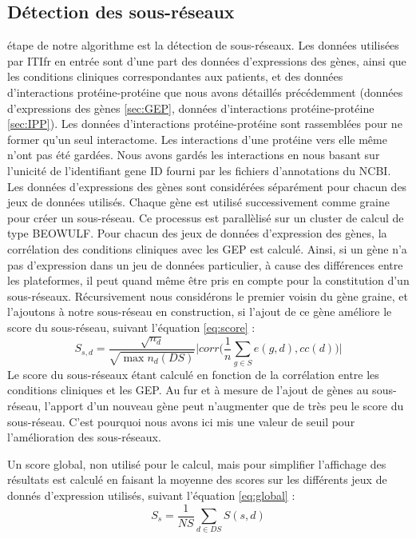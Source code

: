 		\subsection{\textcolor{green!60!black}{Détection des sous-réseaux}}
			 étape de notre algorithme est la détection de sous-réseaux.
			Les données utilisées par \acs{ITIfr} en entrée sont d'une part des données d'expressions des gènes, ainsi que les conditions cliniques correspondantes aux patients, et des données d'interactions protéine-protéine que nous avons détaillés précédemment (données d'expressions des gènes \ref{sec:GEP}, données d'interactions protéine-protéine \ref{sec:IPP}).
			Les données d'interactions protéine-protéine sont rassemblées pour ne former qu'un seul interactome.
			Les interactions d'une protéine vers elle même n'ont pas été gardées.
			Nous avons gardés les interactions en nous basant sur l'unicité de l'identifiant gene ID fourni par les fichiers d'annotations du NCBI. 
			Les données d'expressions des gènes sont considérées séparément pour chacun des jeux de données utilisés.
			Chaque gène est utilisé successivement comme graine pour créer un sous-réseau.
			Ce processus est parallèlisé sur un cluster de calcul de type BEOWULF.
			Pour chacun des jeux de données d'expression des gènes, la corrélation des conditions cliniques avec les \acs{GEP} est calculé.
			Ainsi, si un gène n'a pas d'expression dans un jeu de données particulier, à cause des différences entre les plateformes, il peut quand même être pris en compte pour la constitution d'un sous-réseaux.
			Récursivement nous considérons le premier voisin du gène graine, et l'ajoutons à notre sous-réseau en construction, si l'ajout de ce gène améliore le score du sous-réseau, suivant l'équation \ref{eq:score} :
			\begin{equation}\label{eq:score}
				S_{s,d}=\frac{\sqrt{n_{d}}}{\sqrt{\max n_{d}(DS)}}\Bigg|corr\Bigg(\frac{1}{n}\sum_{g\in S}e(g,d),cc(d)\Bigg)\Bigg|
			\end{equation}
			Le score du sous-réseaux étant calculé en fonction de la corrélation entre les conditions cliniques et les \acs{GEP}.
			Au fur et à mesure de l'ajout de gènes au sous-réseau, l'apport d'un nouveau gène peut n'augmenter que de très peu le score du sous-réseau.
			C'est pourquoi nous avons ici mis une valeur de seuil pour l'amélioration des sous-réseaux.

			Un score global, non utilisé pour le calcul, mais pour simplifier l'affichage des résultats est calculé en faisant la moyenne des scores sur les différents jeux de donnés d'expression utilisés, suivant l'équation \ref{eq:global} :
			\begin{equation}\label{eq:global}
				S_{s}=\frac{1}{NS}\sum_{d\in DS}S(s,d)
			\end{equation}

